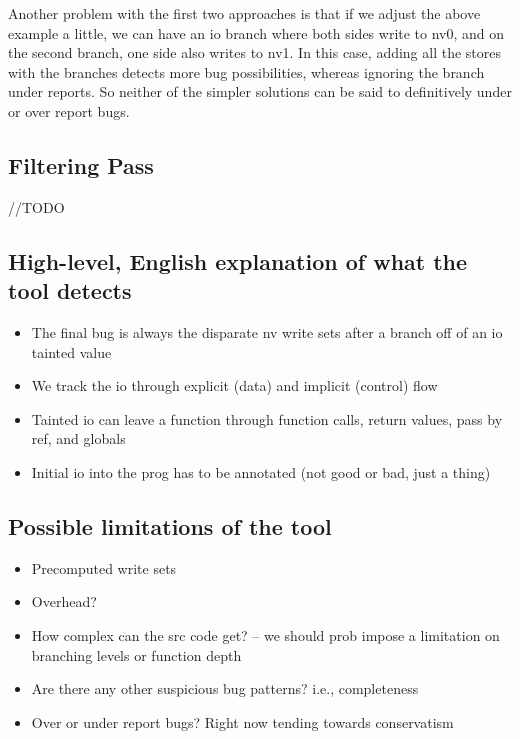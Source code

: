 Another problem with the first two approaches is that if we adjust the above example a little, we can have an io branch where both sides write to nv0, and on the second branch, one side also writes to nv1. In this case, adding all the stores with the branches detects more bug possibilities, whereas ignoring the branch under reports. So neither of the simpler solutions can be said to definitively under or over report bugs. 
	
\subsection{Filtering Pass}
//TODO

\subsection{High-level, English explanation of what the tool detects}
\begin{itemize}
\item{The final bug is always the disparate nv write sets after a branch off of an io tainted value}
\item{We track the io through explicit (data) and implicit (control) flow}
\item{Tainted io can leave a function through function calls, return values, pass by ref, and globals}
\item{Initial io into the prog has to be annotated (not good or bad, just a thing)}
\end{itemize}	
\subsection{Possible limitations of the tool}
\begin{itemize}
\item{Precomputed write sets}  
\item{Overhead?}
\item{How complex can the src code get? -- we should prob impose a limitation on branching levels or function depth}
\item{Are there any other suspicious bug patterns? i.e., completeness}
\item{Over or under report bugs? Right now tending towards conservatism}
\end{itemize}	